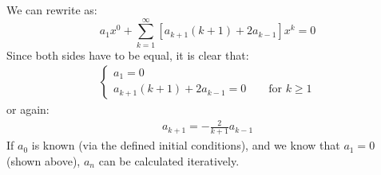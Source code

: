 \begin{exmp}{}
\begin{enumerate}
We can rewrite as:
\begin{equation*}
a_1x^0+ \sum^\infty_{k=1}\left[ a_{k+1} (k+1)+ 2 a_{k-1}\right]x^{k}=0
\end{equation*}
Since both sides have to be equal, it is clear that:
\begin{align*}
 \begin{cases}
a_1=0\\
a_{k+1}(k+1)+2a_{k-1}=0 \qquad \text{for } k\geq 1
\end{cases}
\end{align*}
or again:
\begin{align*}
a_{k+1}=-\frac{2}{k+1}a_{k-1}
\end{align*}
If $a_0$ is known (via the defined initial conditions), and we know that $a_1=0$ (shown above), $a_n$ can be calculated iteratively.


\end{enumerate}
\end{exmp}
